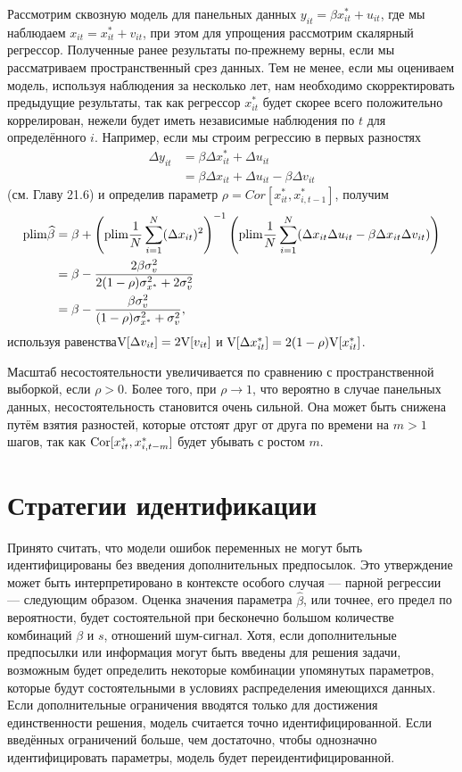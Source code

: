 Рассмотрим сквозную модель для панельных данных $y_{it}=\beta x^*_{it}+u_{it}$, где мы наблюдаем $x_{it}=x^*_{it}+v_{it}$, при этом для упрощения рассмотрим скалярный регрессор. Полученные ранее результаты по-прежнему верны, если мы рассматриваем пространственный срез данных. Тем не менее, если мы оцениваем модель, используя наблюдения за несколько лет, нам необходимо скорректировать  предыдущие результаты, так как регрессор $x^*_{it}$ будет скорее всего положительно коррелирован, нежели  будет иметь независимые наблюдения по $t$ для определённого $i$. Например, если мы строим регрессию в первых разностях
\begin{align*}
\Delta y_{it}&=\beta \Delta x^*_{it}+ \Delta u_{it} \\
&= \beta \Delta x_{it}+\Delta u_{it}-\beta \Delta v_{it}
\end{align*}
(см. Главу 21.6) и определив параметр $\rho = Cor[x^*_{it}, x^*_{i,t-1}]$, получим
\begin{align*}
\mathrm{plim }\widehat{\beta}&=\beta + \left( \mathrm{plim } \frac{1}{N} \sum \limits^{N}_{i=1}(\Delta x_{it})^2 \right)^{-1} \left( \mathrm{plim } \frac{1}{N} \sum \limits^{N}_{i=1}(\Delta x_{it} \Delta u_{it}-\beta \Delta x_{it} \Delta v_{it}) \right) \\
&= \beta - \frac{2\beta \sigma^2_v}{2(1-\rho)\sigma^2_{x^*}+2\sigma^2_v} \\
&=\beta-\frac{\beta \sigma^2_v}{(1-\rho)\sigma^2_{x^*}+\sigma^2_v},
\end{align*}
используя равенства$\mathrm{V}[\Delta v_{it}]=2\mathrm{V}[v_{it}]$ и $\mathrm{V}[\Delta x^*_{it}]=2(1-\rho)\mathrm{V}[x^*_{it}]$.

Масштаб несостоятельности увеличивается по сравнению с пространственной выборкой, если $\rho>0$. Более того, при $\rho\rightarrow 1$, что вероятно в случае панельных данных, несостоятельность становится очень сильной. Она может быть снижена путём взятия разностей, которые отстоят друг от друга по времени на $m>1$ шагов, так как $\mathrm{Cor}[x^*_{it}, x^*_{i,t-m}]$ будет убывать с ростом $m$.

\section{Стратегии идентификации} 

Принято считать, что модели ошибок переменных не могут быть идентифицированы без введения дополнительных предпосылок. Это утверждение может быть интерпретировано в контексте особого случая --- парной регрессии --– следующим образом. Оценка значения параметра $\widehat{\beta}$, или точнее, его предел по вероятности, будет состоятельной при бесконечно большом количестве комбинаций $\beta$ и $s$, отношений шум-сигнал. Хотя, если дополнительные предпосылки или информация могут быть введены для решения задачи, возможным будет определить некоторые комбинации упомянутых параметров, которые будут состоятельными в условиях распределения имеющихся данных. Если дополнительные ограничения вводятся только для достижения единственности решения, модель считается точно идентифицированной. Если введённых ограничений больше, чем достаточно, чтобы однозначно идентифицировать параметры, модель будет переидентифицированной.

